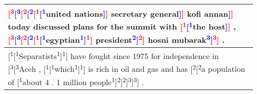 \documentclass[11pt,a4paper]{article}
\begin{document}
\begin{table*}
\small
\centering
  \begin{tabular}{m{15.5cm}}
  \toprule
    \textcolor{red}{[\textsuperscript{3}}\textcolor{blue}{[\textsuperscript{3}}\textcolor{red}{[\textsuperscript{2}}\textcolor{blue}{[\textsuperscript{2}}\textcolor{red}{[\textsuperscript{1}}\textcolor{blue}{[\textsuperscript{1}}united nations\textcolor{blue}{]}\textcolor{red}{]} secretary general\textcolor{blue}{]}\textcolor{red}{]} kofi annan\textcolor{blue}{]}\textcolor{red}{]} today discussed plans for the summit with \textcolor{red}{[\textsuperscript{1}}\textcolor{blue}{[\textsuperscript{1}}the host\textcolor{blue}{]}\textcolor{red}{]} , \textcolor{red}{[\textsuperscript{3}}\textcolor{blue}{[\textsuperscript{3}}\textcolor{red}{[\textsuperscript{2}}\textcolor{blue}{[\textsuperscript{2}}\textcolor{red}{[\textsuperscript{1}}\textcolor{blue}{[\textsuperscript{1}}egyptian\textcolor{blue}{\textsuperscript{1}]}\textcolor{red}{\textsuperscript{1}]} president\textcolor{blue}{\textsuperscript{2}]}\textcolor{red}{\textsuperscript{2}]} hosni mubarak\textcolor{blue}{\textsuperscript{3}]}\textcolor{red}{\textsuperscript{3}]} .\\
\midrule
{\color{red}[\textsuperscript{1}}{\color{blue}[\textsuperscript{1}}Separatists{\color{blue}\textsuperscript{1}]}{\color{red}\textsuperscript{1}]} have fought since 1975 for independence in {\color{red}[\textsuperscript{3}}{\color{blue}[\textsuperscript{3}}Aceh , {\color{red}[\textsuperscript{1}}{\color{blue}[\textsuperscript{1}}which{\color{blue}\textsuperscript{1}]}{\color{red}\textsuperscript{1}]} is rich in oil and gas and has {\color{red}[\textsuperscript{2}}{\color{blue}[\textsuperscript{2}}a population of {\color{blue}[\textsuperscript{1}}about 4 . 1 million people{\color{blue}\textsuperscript{1}]}{\color{blue}\textsuperscript{2}]}{\color{red}\textsuperscript{2}]}{\color{blue}\textsuperscript{3}]}{\color{red}\textsuperscript{3}]} .\\


\end{tabular}
\end{table*}
\end{document}
